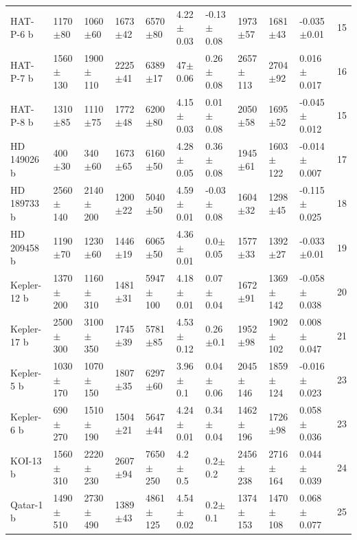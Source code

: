 \begin{subappendices}
{\begin{landscape}
\begin{longtable}{lllllllllll}
HAT-P-6 b   &     1170$\pm$80 &     1060$\pm$60 &   1673$\pm$42 &    6570$\pm$80 &  4.22$\pm$0.03 &  -0.13$\pm$0.08 &        1973$\pm$57 &        1681$\pm$43 &   -0.035$\pm$0.01 &        15 \\
HAT-P-7 b   &    1560$\pm$130 &    1900$\pm$110 &   2225$\pm$41 &    6389$\pm$17 &  47$\pm$0.06 &   0.26$\pm$0.08 &       2657$\pm$113 &        2704$\pm$92 &   0.016$\pm$0.017 &   16 \\
HAT-P-8 b   &     1310$\pm$85 &     1110$\pm$75 &   1772$\pm$48 &    6200$\pm$80 &  4.15$\pm$0.03 &   0.01$\pm$0.08 &        2050$\pm$58 &        1695$\pm$52 &  -0.045$\pm$0.012 &        15 \\
HD 149026 b &      400$\pm$30 &      340$\pm$60 &   1673$\pm$65 &    6160$\pm$50 &  4.28$\pm$0.05 &   0.36$\pm$0.08 &        1945$\pm$61 &       1603$\pm$122 &  -0.014$\pm$0.007 &      17 \\
HD 189733 b &    2560$\pm$140 &    2140$\pm$200 &   1200$\pm$22 &    5040$\pm$50 &  4.59$\pm$0.01 &  -0.03$\pm$0.08 &        1604$\pm$32 &        1298$\pm$45 &  -0.115$\pm$0.025 &    18 \\
HD 209458 b &     1190$\pm$70 &     1230$\pm$60 &   1446$\pm$19 &    6065$\pm$50 &  4.36$\pm$0.01 &    0.0$\pm$0.05 &        1577$\pm$33 &        1392$\pm$27 &   -0.033$\pm$0.01 &   19 \\
Kepler-12 b &    1370$\pm$200 &    1160$\pm$310 &   1481$\pm$31 &   5947$\pm$100 &  4.18$\pm$0.01 &   0.07$\pm$0.04 &        1672$\pm$91 &       1369$\pm$142 &  -0.058$\pm$0.038 &        20 \\
Kepler-17 b &    2500$\pm$300 &    3100$\pm$350 &   1745$\pm$39 &    5781$\pm$85 &  4.53$\pm$0.12 &    0.26$\pm$0.1 &        1952$\pm$98 &       1902$\pm$102 &   0.008$\pm$0.047 &        21 \\
Kepler-5 b  &    1030$\pm$170 &    1070$\pm$150 &   1807$\pm$35 &    6297$\pm$60 &   3.96$\pm$0.1 &   0.04$\pm$0.06 &       2045$\pm$146 &       1859$\pm$124 &  -0.016$\pm$0.023 &        23 \\
Kepler-6 b  &     690$\pm$270 &    1510$\pm$190 &   1504$\pm$21 &    5647$\pm$44 &  4.24$\pm$0.01 &   0.34$\pm$0.04 &       1462$\pm$196 &        1726$\pm$98 &   0.058$\pm$0.036 &         23 \\
KOI-13 b    &    1560$\pm$310 &    2220$\pm$230 &   2607$\pm$94 &   7650$\pm$250 &    4.2$\pm$0.5 &     0.2$\pm$0.2 &       2456$\pm$238 &       2716$\pm$164 &   0.044$\pm$0.039 &        24 \\
Qatar-1 b   &    1490$\pm$510 &    2730$\pm$490 &   1389$\pm$43 &   4861$\pm$125 &  4.54$\pm$0.02 &     0.2$\pm$0.1 &       1374$\pm$153 &       1470$\pm$108 &   0.068$\pm$0.077 &        25 \\

\end{longtable}
\end{landscape}}
\end{subappendices}
